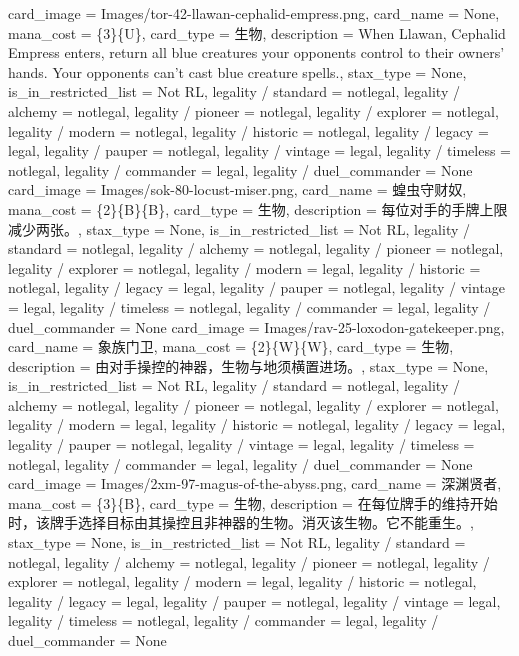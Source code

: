 \documentclass[lang = cn, color = black, 10pt]{AllThatStax}
\begin{document}
\card
{
	card_image = Images/tor-42-llawan-cephalid-empress.png,
	card_name = None,
	mana_cost = \{3\}\{U\},
	card_type = 生物,
	description = When Llawan, Cephalid Empress enters, return all blue creatures your opponents control to their owners' hands.
	Your opponents can't cast blue creature spells.,
	stax_type = None,
	is_in_restricted_list = Not RL,
	legality / standard = notlegal,
	legality / alchemy = notlegal,
	legality / pioneer = notlegal,
	legality / explorer = notlegal,
	legality / modern = notlegal,
	legality / historic = notlegal,
	legality / legacy = legal,
	legality / pauper = notlegal,
	legality / vintage = legal,
	legality / timeless = notlegal,
	legality / commander = legal,
	legality / duel_commander = None
}
\card
{
	card_image = Images/sok-80-locust-miser.png,
	card_name = 蝗虫守财奴,
	mana_cost = \{2\}\{B\}\{B\},
	card_type = 生物,
	description = 每位对手的手牌上限减少两张。,
	stax_type = None,
	is_in_restricted_list = Not RL,
	legality / standard = notlegal,
	legality / alchemy = notlegal,
	legality / pioneer = notlegal,
	legality / explorer = notlegal,
	legality / modern = legal,
	legality / historic = notlegal,
	legality / legacy = legal,
	legality / pauper = notlegal,
	legality / vintage = legal,
	legality / timeless = notlegal,
	legality / commander = legal,
	legality / duel_commander = None
}
\card
{
	card_image = Images/rav-25-loxodon-gatekeeper.png,
	card_name = 象族门卫,
	mana_cost = \{2\}\{W\}\{W\},
	card_type = 生物,
	description = 由对手操控的神器，生物与地须横置进场。,
	stax_type = None,
	is_in_restricted_list = Not RL,
	legality / standard = notlegal,
	legality / alchemy = notlegal,
	legality / pioneer = notlegal,
	legality / explorer = notlegal,
	legality / modern = legal,
	legality / historic = notlegal,
	legality / legacy = legal,
	legality / pauper = notlegal,
	legality / vintage = legal,
	legality / timeless = notlegal,
	legality / commander = legal,
	legality / duel_commander = None
}
\card
{
	card_image = Images/2xm-97-magus-of-the-abyss.png,
	card_name = 深渊贤者,
	mana_cost = \{3\}\{B\},
	card_type = 生物,
	description = 在每位牌手的维持开始时，该牌手选择目标由其操控且非神器的生物。消灭该生物。它不能重生。,
	stax_type = None,
	is_in_restricted_list = Not RL,
	legality / standard = notlegal,
	legality / alchemy = notlegal,
	legality / pioneer = notlegal,
	legality / explorer = notlegal,
	legality / modern = legal,
	legality / historic = notlegal,
	legality / legacy = legal,
	legality / pauper = notlegal,
	legality / vintage = legal,
	legality / timeless = notlegal,
	legality / commander = legal,
	legality / duel_commander = None
}
\end{document}
